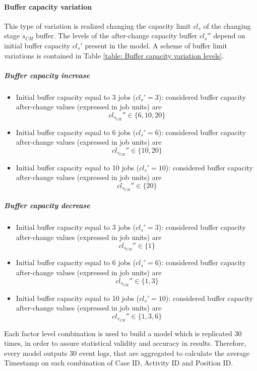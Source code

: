 \paragraph{Buffer capacity variation}
This type of variation is realized changing the capacity limit $cl_s$ of the changing stage $s_{CH}$ buffer. The levels of the after-change capacity buffer $cl_s''$ depend on initial buffer capacity $cl_s'$ present in the model. A scheme of buffer limit variations is contained in Table \ref{table: Buffer capacity variation levels}.
\subparagraph{Buffer capacity increase}
\begin{itemize}
\item Initial buffer capacity equal to 3 jobs ($cl_s'=3$): considered buffer capacity after-change values (expressed in job units) are
\[cl_{s_{CH}}''\in\{6,10,20\}\]
\item Initial buffer capacity equal to 6 jobs ($cl_s'=6$): considered buffer capacity after-change values (expressed in job units) are
\[cl_{s_{CH}}''\in\{10,20\}\]
\item Initial buffer capacity equal to 10 jobs ($cl_s'=10$): considered buffer capacity after-change values (expressed in job units) are
\[cl_{s_{CH}}''\in\{20\}\]
\end{itemize}
\subparagraph{Buffer capacity decrease}
\begin{itemize}
\item Initial buffer capacity equal to 3 jobs ($cl_s'=3$): considered buffer capacity after-change values (expressed in job units) are
\[cl_{s_{CH}}''\in\{1\}\]
\item Initial buffer capacity equal to 6 jobs ($cl_s'=6$): considered buffer capacity after-change values (expressed in job units) are
\[cl_{s_{CH}}''\in\{1,3\}\]
\item Initial buffer capacity equal to 10 jobs ($cl_s'=10$): considered buffer capacity after-change values (expressed in job units) are
\[cl_{s_{CH}}''\in\{1,3,6\}\]
\end{itemize}
Each factor level combination is used to build a model which is replicated 30 times, in order to assure statistical validity and accuracy in results. Therefore, every model outputs 30 event logs, that are aggregated to calculate the average Timestamp on each combination of Case ID, Activity ID and Position ID. 
